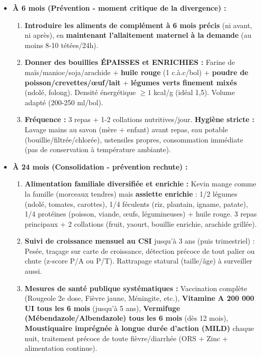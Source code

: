 \documentclass[11pt]{article}
\begin{document}
\begin{corrige}
\begin{enumerate}
\begin{itemize}
        \item \textbf{À 6 mois (Prévention - moment critique de la divergence) :}
        \begin{enumerate}
            \item \textbf{Introduire les aliments de complément à 6 mois précis} (ni avant, ni après), en \textbf{maintenant l'allaitement maternel à la demande} (au moins 8-10 tétées/24h).
            \item \textbf{Donner des bouillies ÉPAISSES et ENRICHIES :} Farine de maïs/manioc/soja/arachide + \textbf{huile rouge} (1 c.à.c/bol) + \textbf{poudre de poisson/crevettes/œuf/lait} + \textbf{légumes verts finement mixés} (ndolé, folong). Densité énergétique $\ge 1$ kcal/g (idéal 1,5). Volume adapté (200-250 ml/bol).
            \item \textbf{Fréquence :} 3 repas + 1-2 collations nutritives/jour. \textbf{Hygiène stricte :} Lavage mains au savon (mère + enfant) avant repas, eau potable (bouillie/filtrée/chlorée), ustensiles propres, consommation immédiate (pas de conservation à température ambiante).
        \end{enumerate}
        \item \textbf{À 24 mois (Consolidation - prévention rechute) :}
        \begin{enumerate}
            \item \textbf{Alimentation familiale diversifiée et enrichie :} Kevin mange comme la famille (morceaux tendres) mais \textbf{assiette enrichie} : 1/2 légumes (ndolé, tomates, carottes), 1/4 féculents (riz, plantain, igname, patate), 1/4 protéines (poisson, viande, œufs, légumineuses) + huile rouge. 3 repas principaux + 2 collations (fruit, yaourt, bouillie enrichie, arachide grillée).
            \item \textbf{Suivi de croissance mensuel au CSI} jusqu'à 3 ans (puis trimestriel) : Pesée, traçage sur carte de croissance, détection précoce de tout palier ou chute (z-score P/A ou P/T). Rattrapage statural (taille/âge) à surveiller aussi.
            \item \textbf{Mesures de santé publique systématiques :} Vaccination complète (Rougeole 2e dose, Fièvre jaune, Méningite, etc.), \textbf{Vitamine A 200 000 UI tous les 6 mois} (jusqu'à 5 ans), \textbf{Vermifuge (Mébendazole/Albendazole) tous les 6 mois} (dès 12 mois), \textbf{Moustiquaire imprégnée à longue durée d'action (MILD)} chaque nuit, traitement précoce de toute fièvre/diarrhée (ORS + Zinc + alimentation continue).
        \end{enumerate}
    \end{itemize}
\end{enumerate}
\end{corrige}
\end{document}
